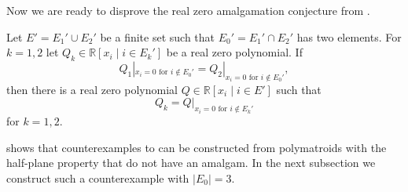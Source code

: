 \documentclass[11pt]{article}
\theoremstyle{definition}
\numberwithin{equation}{section}
\newcommand{\R}{{\mathbb R}}
\begin{document}
Now we are ready to disprove the real zero amalgamation conjecture from \cite{rzamalgamation}.

\begin{con}\label{con:weakrzamal}
    Let $E'=E_1'\cup E_2'$ be a finite set such that $E_0'=E_1'\cap E_2'$ has two elements. For $k=1,2$ let $Q_k\in\R[x_i\mid i\in E_k']$ be a real zero polynomial.
    If
    \begin{equation*}
        Q_1|_{x_i=0\textrm{ for }i\not\in E_0'}=Q_2|_{x_i=0\textrm{ for }i\not\in E_0'},
    \end{equation*}
    then there is a real zero polynomial $Q\in\R[x_i\mid i\in E']$ such that 
    \begin{equation*}
     Q_k=Q|_{x_i=0\textrm{ for }i\not\in E_k'}   
    \end{equation*}
     for $k=1,2$.
\end{con}

 shows that counterexamples to  can be constructed from polymatroids with the half-plane property that do not have an amalgam. In the next subsection we construct such a counterexample with $|E_0|=3$.
\end{document}
